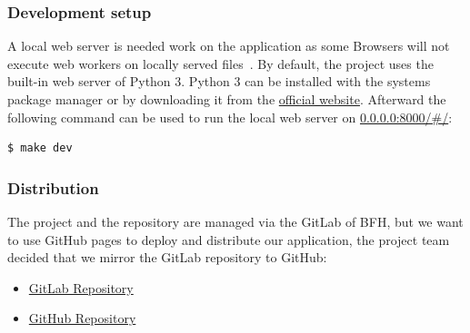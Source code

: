 \subsubsection{Development setup}\label{subsubsec:deployment-setup}
A local web server is needed work on the application as some Browsers will not execute web workers on locally served files~\cite{stackoverflow_chrome_cant_load_web_worker}.
By default, the project uses the built-in web server of Python 3.
Python 3 can be installed with the systems package manager or by downloading it from the \href{https://www.python.org/downloads/}{official website}.
Afterward the following command can be used to run the local web server on \href{http://0.0.0.0:8000/}{0.0.0.0:8000/\#/}:

\begin{lstlisting}[caption={Makefile: Start local webserver},label={lst:makefile_start_local_webserver},language=Bash]
$ make dev
\end{lstlisting}

\subsubsection{Distribution}
The project and the repository are managed via the GitLab of BFH,
but we want to use GitHub pages to deploy and distribute our application,
the project team decided that we mirror the GitLab repository to GitHub:
\begin{itemize}
    \item \href{https://gitlab.ti.bfh.ch/decibel-threshold-event-displayer/decibel-threshold-event-displayer}{GitLab Repository}
    \item \href{https://github.com/decibel-threshold-event-displayer/decibel-threshold-event-displayer.github.io}{GitHub Repository}
\end{itemize}

